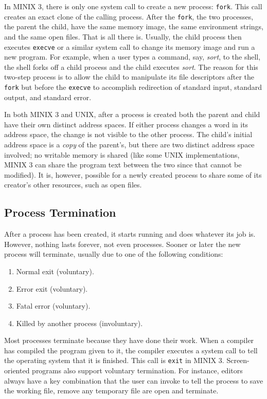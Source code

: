 \documentclass{book}
\newcommand {\sys} [1] {\textsl{#1}}
\newcommand {\cmd} [1] {\texttt{#1}}
\begin{document}
In MINIX 3, there is only one system call to create a new process: \cmd{fork}.
This call creates an exact clone of the calling process.
After the \cmd{fork}, the two processes, the parent the child, have the same memory image, the same environment strings, and the same open files.
That is all there is.
Usually, the child process then executes \cmd{execve} or a similar system call to change its memory image and run a new program.
For example, when a user types a command, say, \sys{sort}, to the shell,
the shell forks off a child process and the child executes \sys{sort}.
The reason for this two-step process is to allow the child to manipulate its file descriptors after the \cmd{fork} 
but before the \cmd{execve} to accomplish redirection of standard input, standard output, and standard error.

In both MINIX 3 and UNIX, after a process is created both the parent and child have their own distinct address spaces.
If either process changes a word in its address space, the change is not visible to the other process.
The child's initial address space is a \sys{copy} of the parent's,
but there are two distinct address space involved; no writable memory is shared (like some UNIX implementations, 
MINIX 3 can share the program text between the two since that cannot be modified).
It is, however, possible for a newly created process to share some of its creator's other resources, such as open files.

\subsection{Process Termination}
After a process has been created, it starts running and does whatever its job is.
However, nothing lasts forever, not even processes.
Sooner or later the new process will terminate, usually due to one of the following conditions:
\begin{enumerate}
  \item Normal exit (voluntary).
  \item Error exit (voluntary).
  \item Fatal error (voluntary).
  \item Killed by another process (involuntary).
\end{enumerate}

Most processes terminate because they have done their work.
When a compiler has compiled the program given to it, 
the compiler executes a system call to tell the operating system that it is finished.
This call is \cmd{exit} in MINIX 3.
Screen-oriented programs also support voluntary termination.
For instance, editors always have a key combination that the user can invoke to tell the process to save the working file, 
remove any temporary file are open and terminate.
\end{document}
